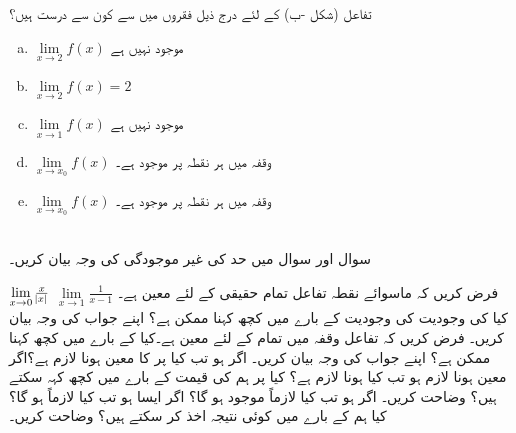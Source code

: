تفاعل  (شکل -ب)  کے لئے درج ذیل فقروں میں سے کون سے درست ہیں؟
\begin{multicols}{3}
\begin{enumerate}[a.]
\item
$\lim\limits_{x\to 2} f(x)$
موجود نہیں ہے
\item
$\lim\limits_{x\to 2}f(x)=2$
\item
$\lim\limits_{x\to 1}f(x)$
موجود نہیں ہے
\item
$\lim\limits_{x\to x_0}f(x)$
وقفہ  میں ہر نقطہ  پر موجود ہے۔
\item
$\lim\limits_{x\to x_0}f(x)$
وقفہ  میں ہر نقطہ  پر موجود ہے۔
\end{enumerate}
\end{multicols}

\\
سوال  اور سوال  میں حد کی غیر موجودگی کی وجہ بیان کریں۔

$\lim\limits_{x \to 0}\tfrac{x}{\abs{x}}$
$\lim\limits_{x \to 1}\tfrac{1}{x-1}$
فرض کریں کہ ماسوائے نقطہ  تفاعل  تمام حقیقی  کے لئے معین ہے۔کیا  کی وجودیت کی وجودیت کے بارے میں کچھ کہنا ممکن ہے؟ اپنے جواب کی وجہ بیان کریں۔ 
فرض کریں کہ  تفاعل  وقفہ  میں تمام   کے لئے معین ہے۔کیا  کے بارے میں کچھ کہنا ممکن ہے؟ اپنے جواب کی وجہ بیان کریں۔ 
اگر  ہو تب کیا  پر  کا معین ہونا لازم ہے؟اگر معین ہونا لازم ہو تب کیا  ہونا لازم ہے؟ کیا  پر ہم  کی قیمت کے بارے میں کچھ کہہ سکتے ہیں؟ وضاحت کریں۔
اگر  ہو تب کیا  لازماً موجود ہو گا؟ اگر ایسا ہو تب کیا  لازماً ہو گا؟ کیا ہم   کے بارے میں کوئی نتیجہ اخذ کر سکتے ہیں؟ وضاحت کریں۔

\\

